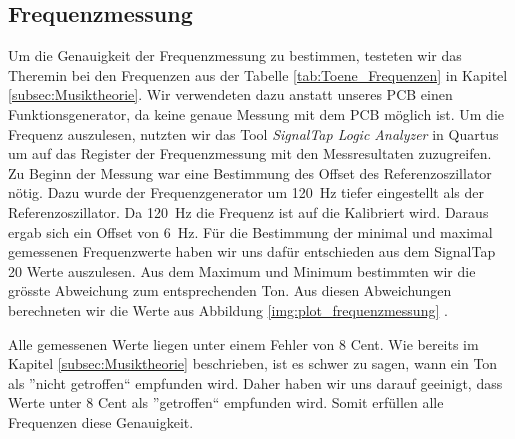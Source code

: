 \subsection{Frequenzmessung}\label{subsec:Frequenzmessung}
Um die Genauigkeit der Frequenzmessung zu bestimmen, testeten wir das Theremin bei den  Frequenzen aus der Tabelle \ref{tab:Toene_Frequenzen} in Kapitel \ref{subsec:Musiktheorie}.
 Wir verwendeten dazu anstatt unseres PCB einen Funktionsgenerator, da keine genaue Messung mit dem PCB möglich ist. Um die Frequenz auszulesen, nutzten wir das Tool \textit{SignalTap Logic Analyzer} in Quartus um auf das Register der Frequenzmessung mit den Messresultaten zuzugreifen.
 Zu Beginn der Messung war eine Bestimmung des Offset des Referenzoszillator nötig. Dazu wurde der Frequenzgenerator um \SI{120}{Hz} tiefer eingestellt als der Referenzoszillator. Da \SI{120}{Hz} die Frequenz ist auf die Kalibriert wird. Daraus ergab sich ein Offset von  \SI{6}{Hz}.
 Für die Bestimmung der minimal und maximal gemessenen Frequenzwerte haben wir uns dafür entschieden aus dem SignalTap 20 Werte auszulesen. Aus dem Maximum und Minimum bestimmten wir die grösste Abweichung zum entsprechenden Ton. Aus diesen Abweichungen berechneten wir die Werte aus Abbildung \ref{img:plot_frequenzmessung} .

 Alle gemessenen Werte liegen unter einem Fehler von 8 Cent. Wie bereits im Kapitel \ref{subsec:Musiktheorie} beschrieben, ist es schwer zu sagen, wann ein Ton als ''nicht getroffen`` empfunden wird. Daher haben wir uns darauf geeinigt, dass Werte unter 8 Cent als ''getroffen`` empfunden wird. Somit erfüllen alle Frequenzen diese Genauigkeit.
 
